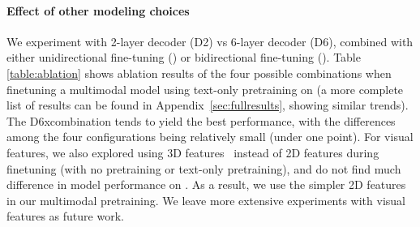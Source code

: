 \documentclass[11pt,a4paper]{article}
\begin{document}
 \paragraph{Effect of other modeling choices}
We experiment with 2-layer decoder (D2) vs 6-layer decoder (D6), combined with either unidirectional fine-tuning (\textbf{\unimt}) or bidirectional fine-tuning (\textbf{\bimt}).
Table \ref{table:ablation} shows ablation results of the four possible combinations when finetuning a multimodal model using text-only pretraining on \youcook (a more complete list of results can be found in Appendix~\ref{sec:fullresults}, showing similar trends).
The D6x\bimt combination tends to yield the best performance, with the differences among the four configurations being relatively small (under one \rouge point).  
For visual features, we also explored using 3D features~\citep{xie2018rethinking} instead of 2D features during finetuning (with no pretraining or text-only pretraining), and do not find much difference in model performance on \youcook.
As a result, we use the simpler 2D features in our multimodal pretraining.  We leave more extensive experiments with visual features  as future work. 















\iffalse
\paragraph{Effect of Bidirectional Finetuning.} The second most important factor is bidirectional finetuning. Using some variant of bidirectional finetuning is always beneficial, both for text-only and multimodal video captioning, whether training from scratch or from a pretraind model. 
We find it surprising that bidirectional finetuning helps even for pretrained models. Our original hypothesis was that bidirectional training would only help when training from scratch because it would help learn better word embeddings since the captioning datasets are so small. We leave to future work to understand why bidirectional finetuning helps for pretrained models.
However, only the \bimt variant is consistently better in the multimodal case; we hypothesize that the model might have difficulties sharing the same cross-modal attention modules between ASR+videoCAP and CAP+videoASR, whereas with \bimt the attention modules are only used for one direction.
\fi
\end{document}
